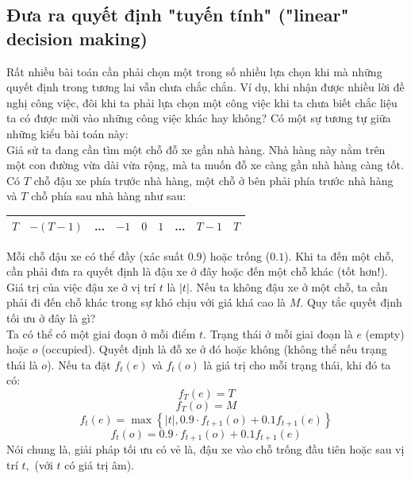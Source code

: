 \documentclass[12pt,a4paper]{article}
\begin{document}
\subsection{Đưa ra quyết định "tuyến tính" ("linear" decision making)}
Rất nhiều bài toán cần phải chọn một trong số nhiều lựa chọn khi mà những quyết định trong tương lai vẫn chưa chắc chắn. Ví dụ, khi nhận được nhiều lời đề nghị công việc, đôi khi ta phải lựa chọn một công việc khi ta chưa biết chắc liệu ta có được mời vào những công việc khác hay không? Có một sự tương tự giữa những kiểu bài toán này:\\
Giả sử ta đang cần tìm một chỗ đỗ xe gần nhà hàng. Nhà hàng này nằm trên một con đường vừa dài vừa rộng, mà ta muốn đỗ xe càng gần nhà hàng càng tốt. Có \(T\) chỗ đậu xe phía trước nhà hàng, một chỗ ở bên phải phía trước nhà hàng và \(T\) chỗ phía sau nhà hàng như sau: 
\begin{center}
\begin{table}[H]
\begin{tabular}{|c|c|c|c|c|c|c|c|c|}
\hline 
\(T\) & \(- \left( {T - 1} \right)\) & ... & \(-1\) & \(0\) & \(1\) & ... & \(T - 1\) & \(T\) \\ 
\hline 
\end{tabular} 
\end{table}
\end{center}
Mỗi chỗ đậu xe có thể đầy (xác suất \(0.9\)) hoặc trống (\(0.1\)). Khi ta đến một chỗ, cần phải đưa ra quyết định là đậu xe ở đây hoặc đến một chỗ khác (tốt hơn!). Giá trị của việc đậu xe ở vị trí \(t\) là \(\left| t \right|.\) Nếu ta không đậu xe ở một chỗ, ta cần phải đi đến chỗ khác trong sự khó chịu với giá khá cao là \(M.\) Quy tắc quyết định tối ưu ở đây là gì?\\
Ta có thể có một giai đoạn ở mỗi điểm \(t.\) Trạng thái ở mỗi giai đoạn là \(e\) (empty) hoặc \(o\) (occupied). Quyết định là đỗ xe ở đó hoặc không (không thể nếu trạng thái là \(o\)). Nếu ta đặt \({f_t}\left( e \right)\) và \({f_t}\left( o \right)\) là giá trị cho mỗi trạng thái, khi đó ta có:
\[{f_T}\left( e \right) = T\]
\[{f_T}\left( o \right) = M\]
\[{f_t}\left( e \right) = \max \left\{ {\left| t \right|,0.9 \cdot {f_{t + 1}}\left( o \right) + 0.1{f_{t + 1}}\left( e \right)} \right\}\]
\[{f_t}\left( o \right) = 0.9 \cdot {f_{t + 1}}\left( o \right) + 0.1{f_{t + 1}}\left( e \right)\]
Nói chung là, giải pháp tối ưu có vẻ là, đậu xe vào chỗ trống đầu tiên hoặc sau vị trí \(t,\) (với \(t\) có giá trị âm).
\end{document}
